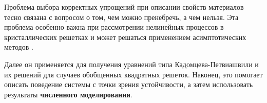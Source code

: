 Проблема выбора корректных упрощений при описании свойств материалов тесно связана с вопросом о том, чем можно пренебречь, а чем нельзя. Эта проблема особенно важна при рассмотрении нелинейных процессов в кристаллических решетках и может решаться применением асимптотических методов \cite{Maug, Zabus, engbook83, Manev, Zab, engber, PorBer, PorBer2, porkros, porosmich1, porosmich2}.
	
	
Далее он применяется для получения уравнений типа Кадомцева-Петвиашвили \cite {kadpet} и их решений для случаев обобщенных квадратных решеток. Наконец, это помогает описать поведение системы с точки зрения устойчивости, а затем использовать результаты \textbf{численного моделирования}.

	
